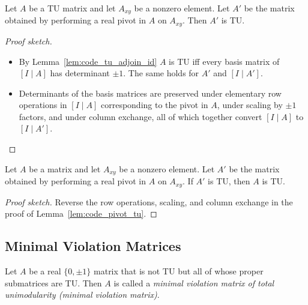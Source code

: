 \begin{lemma}
  \label{lem:code_pivot_tu}
  Let $A$ be a TU matrix and let $A_{xy}$ be a nonzero element.
  Let $A'$ be the matrix obtained by performing a real pivot in $A$ on $A_{xy}$.
  Then $A'$ is TU.
\end{lemma}

\begin{proof}[Proof sketch]
  \begin{itemize}
    \item By Lemma~\ref{lem:code_tu_adjoin_id} $A$ is TU iff every basis matrix of $\left[ I \mid A \right]$ has determinant $\pm 1$. The same holds for $A'$ and $\left[ I \mid A' \right]$.
    \item Determinants of the basis matrices are preserved under elementary row operations in $\left[ I \mid A \right]$ corresponding to the pivot in $A$, under scaling by $\pm 1$ factors, and under column exchange, all of which together convert $\left[ I \mid A \right]$ to $\left[ I \mid A' \right]$.
  \end{itemize}
\end{proof}

\begin{lemma}
  \label{lem:code_reverse_pivot_tu}
  Let $A$ be a matrix and let $A_{xy}$ be a nonzero element.
  Let $A'$ be the matrix obtained by performing a real pivot in $A$ on $A_{xy}$.
  If $A'$ is TU, then $A$ is TU.
\end{lemma}

\begin{proof}[Proof sketch]
  Reverse the row operations, scaling, and column exchange in the proof of Lemma~\ref{lem:code_pivot_tu}.
\end{proof}


\subsection{Minimal Violation Matrices}

\begin{definition}
  \label{def:code_mvm}
  Let $A$ be a real $\{0, \pm 1\}$ matrix that is not TU but all of whose proper submatrices are TU.
  Then $A$ is called a \emph{minimal violation matrix of total unimodularity (minimal violation matrix)}.
\end{definition}

